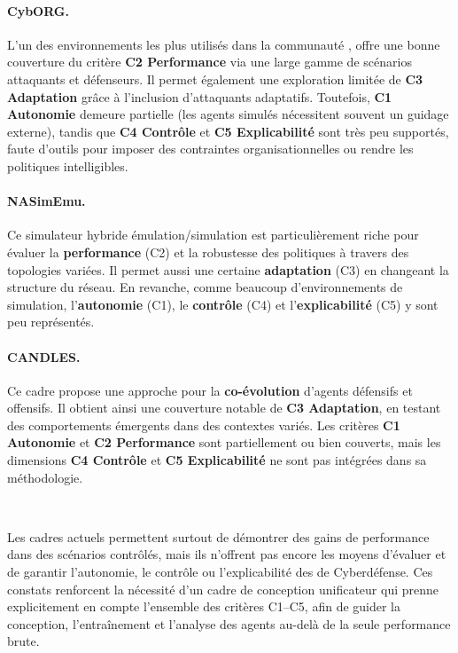 \paragraph{CybORG.} L'un des environnements les plus utilisés dans la communauté ,  offre une bonne couverture du critère \textbf{C2 Performance} via une large gamme de scénarios attaquants et défenseurs. Il permet également une exploration limitée de \textbf{C3 Adaptation} grâce à l'inclusion d'attaquants adaptatifs. Toutefois, \textbf{C1 Autonomie} demeure partielle (les agents simulés nécessitent souvent un guidage externe), tandis que \textbf{C4 Contrôle} et \textbf{C5 Explicabilité} sont très peu supportés, faute d'outils pour imposer des contraintes organisationnelles ou rendre les politiques intelligibles.

\paragraph{NASimEmu.} Ce simulateur hybride émulation/simulation est particulièrement riche pour évaluer la \textbf{performance} (C2) et la robustesse des politiques à travers des topologies variées. Il permet aussi une certaine \textbf{adaptation} (C3) en changeant la structure du réseau. En revanche, comme beaucoup d'environnements de simulation, l'\textbf{autonomie} (C1), le \textbf{contrôle} (C4) et l'\textbf{explicabilité} (C5) y sont peu représentés.

\paragraph{CANDLES.} Ce cadre propose une approche pour la \textbf{co-évolution} d'agents défensifs et offensifs. Il obtient ainsi une couverture notable de \textbf{C3 Adaptation}, en testant des comportements émergents dans des contextes variés. Les critères \textbf{C1 Autonomie} et \textbf{C2 Performance} sont partiellement ou bien couverts, mais les dimensions \textbf{C4 Contrôle} et \textbf{C5 Explicabilité} ne sont pas intégrées dans sa méthodologie.

\

\noindent Les cadres actuels permettent surtout de démontrer des gains de performance dans des scénarios contrôlés, mais ils n'offrent pas encore les moyens d'évaluer et de garantir l'autonomie, le contrôle ou l'explicabilité des  de Cyberdéfense. Ces constats renforcent la nécessité d'un cadre de conception unificateur qui prenne explicitement en compte l'ensemble des critères C1--C5, afin de guider la conception, l'entraînement et l'analyse des agents au-delà de la seule performance brute.

